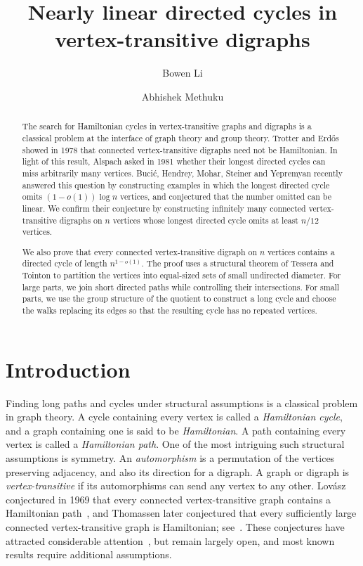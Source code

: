 \documentclass[11pt,a4paper,reqno]{amsart}
\title{Nearly linear directed cycles in vertex-transitive digraphs}
\author{Bowen Li}
\author{Abhishek Methuku}
\date{}
\theoremstyle{definition}
\theoremstyle{remark}
\numberwithin{equation}{section}
\begin{document}
\begin{abstract}
The search for Hamiltonian cycles in vertex-transitive graphs and digraphs is a classical problem at the interface of graph theory and group theory. Trotter and Erd\H{o}s showed in 1978 that connected vertex-transitive digraphs need not be Hamiltonian. In light of this result, Alspach asked in 1981 whether their longest directed cycles can miss arbitrarily many vertices. Buci\'c, Hendrey, Mohar, Steiner and Yepremyan recently answered this question by constructing examples in which the longest directed cycle omits $(1-o(1))\log n$ vertices, and conjectured that the number omitted can be linear. We confirm their conjecture by constructing infinitely many connected vertex-transitive digraphs on $n$ vertices whose longest directed cycle omits at least $n/12$ vertices.

We also prove that every connected vertex-transitive digraph on $n$ vertices contains a directed cycle of length $n^{1-o(1)}$. The proof uses a structural theorem of Tessera and Tointon to partition the vertices into equal-sized sets of small undirected diameter. For large parts, we join short directed paths while controlling their intersections. For small parts, we use the group structure of the quotient to construct a long cycle and choose the walks replacing its edges so that the resulting cycle has no repeated vertices.
\end{abstract}
\maketitle

\section{Introduction}
Finding long paths and cycles under structural assumptions is a classical problem in graph theory. A cycle containing every vertex is called a \emph{Hamiltonian cycle}, and a graph containing one is said to be \emph{Hamiltonian}. A path containing every vertex is called a \emph{Hamiltonian path}. One of the most intriguing such structural assumptions is symmetry. An \emph{automorphism} is a permutation of the vertices preserving adjacency, and also its direction for a digraph. A graph or digraph is \emph{vertex-transitive} if its automorphisms can send any vertex to any other. Lov\'asz conjectured in 1969 that every connected vertex-transitive graph contains a Hamiltonian path~\cite{Lovasz}, and Thomassen later conjectured that every sufficiently large connected vertex-transitive graph is Hamiltonian; see~\cite{Babai}. These conjectures have attracted considerable attention~\cite{Alspach,CurranGallian,PakRadoicic,WitteGallian}, but remain largely open, and most known results require additional assumptions.
\end{document}

